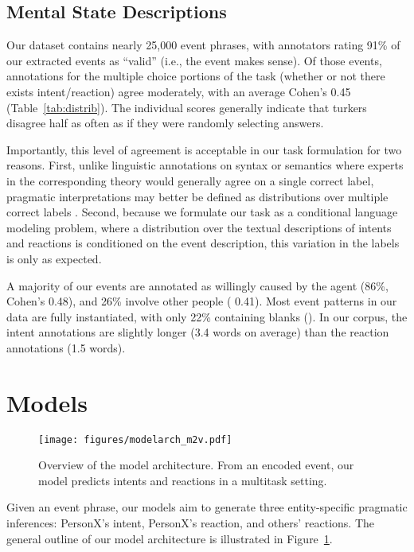 \documentclass[11pt,a4paper]{article}
\newcommand{\blank}{\xspace}
\begin{document}
\subsection{Mental State Descriptions}
Our  dataset contains nearly 25,000 event phrases, with annotators rating 91\% of our extracted events as ``valid'' (i.e., the event makes sense).
Of those events, annotations for the multiple choice portions of the task (whether or not there exists intent/reaction) agree moderately, with an average Cohen's  0.45 (Table~\ref{tab:distrib}).
The individual  scores generally indicate that turkers disagree half as often as if they were randomly selecting answers. 

Importantly, this level of agreement is acceptable in our task formulation for two reasons. First, 
unlike linguistic annotations on syntax or semantics where experts in the corresponding theory would generally agree on a single correct label, pragmatic interpretations may better be defined as distributions over multiple correct labels \citep[e.g., after \texttt{PersonX takes a test}, PersonX might feel relieved and/or stressed;][]{Marneffe2012DidIH}.
Second, because we formulate our task as a conditional language modeling problem, where  a distribution over the textual descriptions of intents and reactions is conditioned on the event description, this variation in the labels is only as expected.

A majority of our events are annotated as willingly caused by the agent (86\%,
Cohen's  0.48), and 26\% involve other people ( 0.41).
Most event patterns in our data are fully instantiated, with only 22\% containing blanks (\texttt{\blank}).
In our corpus, the intent annotations are slightly longer (3.4 words on average) than the reaction annotations (1.5 words).
 \section{Models}
\begin{figure}[tb]
\centering
\texttt{[image: figures/modelarch\_m2v.pdf]}
\caption{Overview of the model architecture. From an encoded event, our model predicts intents and reactions in a multitask setting.}
\label{fig:modelArchitecture}
\end{figure}



Given an event phrase, our models aim to generate three entity-specific pragmatic inferences:  PersonX's intent, PersonX's reaction, and others' reactions. 
The general outline of our model architecture is illustrated in Figure~\ref{fig:modelArchitecture}.
\end{document}
